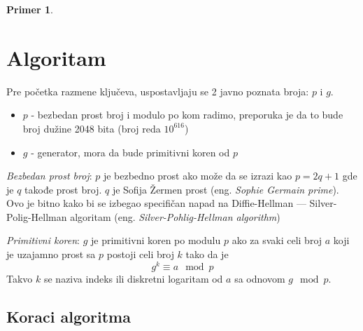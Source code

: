 \documentclass[a4paper]{article}
\newtheorem{primer}{Primer}[subsection]
\begin{document}
{\begin{primer}
\end{primer}





\section{Algoritam}
\label{sec:algoritam}

Pre početka razmene ključeva, uspostavljaju se 2 javno poznata broja: $p$ i $g$.
\begin{itemize}

    \item $p$ - bezbedan prost broj i modulo po kom radimo, preporuka je da to bude broj dužine 2048 bita (broj reda $10^{616}$) \cite{logjam}
    \item $g$ - generator, mora da bude primitivni koren od $p$

\end{itemize}

\emph{Bezbedan prost broj}: $p$ je bezbedno prost ako može da se izrazi kao $p = 2q + 1$ gde je $q$ takođe prost broj. 
$q$ je Sofija Žermen prost (eng. \emph{Sophie Germain prime}). 
Ovo je bitno kako bi se izbegao specifičan napad na Diffie-Hellman --- 
Silver-Polig-Hellman algoritam (eng. \emph{Silver-Pohlig-Hellman algorithm}) \cite{pohlig-hellman}

\emph{Primitivni koren}: $g$ je primitivni koren po modulu $p$ ako za svaki celi broj $a$ koji je uzajamno prost sa $p$ postoji celi broj $k$ tako da je
    \[g^k \equiv a \mod p\]
Takvo $k$ se naziva indeks ili diskretni logaritam od $a$ sa odnovom $g \mod p$.



\subsection{Koraci algoritma}
\label{subsec:koraci_algoritma}

}
\end{document}
